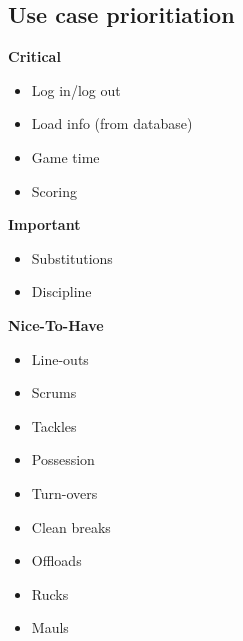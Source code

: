 \documentclass[a4paper,12pt]{report}
\begin{document}
\subsection{Use case prioritiation}
\textbf{Critical} 
\begin{itemize}
  \item Log in/log out
  \item Load info (from database)
  \item Game time
  \item Scoring
\end{itemize}
\textbf{Important} 
\begin{itemize}
  \item Substitutions
  \item Discipline
\end{itemize}
\textbf{Nice-To-Have} 
\begin{itemize}
  \item Line-outs
  \item Scrums
  \item Tackles
  \item Possession 
  \item Turn-overs
  \item Clean breaks
  \item Offloads
  \item Rucks
  \item Mauls
\end{itemize}
\end{document}
